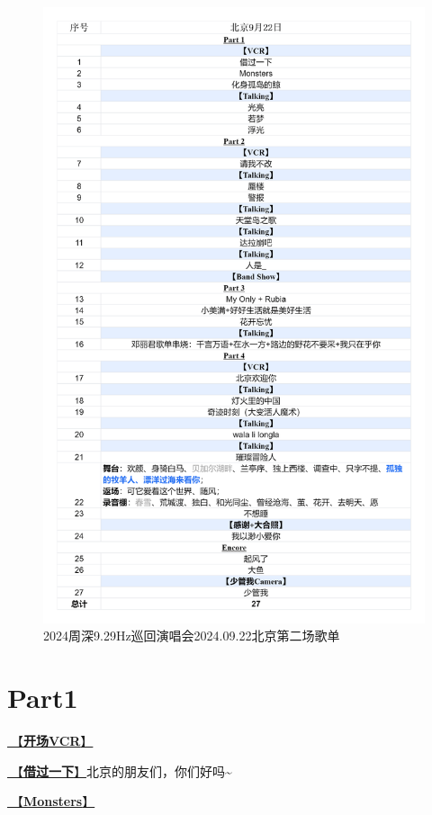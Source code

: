 \documentclass[]{ctexbook}
\begin{document}
\begin{figure}

{\centering \includegraphics[width=320pt]{img/playlists/playlists-beijing-20240922} 

}

\caption{2024周深9.29Hz巡回演唱会2024.09.22北京第二场歌单}\label{fig:unnamed-chunk-88}
\end{figure}

\newpage

\section{Part1}\label{beijing-20240922-part1}

\hyperref[opening-vcr]{🎥【\textbf{开场VCR}】}

\hyperref[I-will-go-my-way]{🎵【\textbf{借过一下}】}北京的朋友们，你们好吗\textasciitilde{}

\hyperref[Monsters]{🎵【\textbf{Monsters}】}
\end{document}

